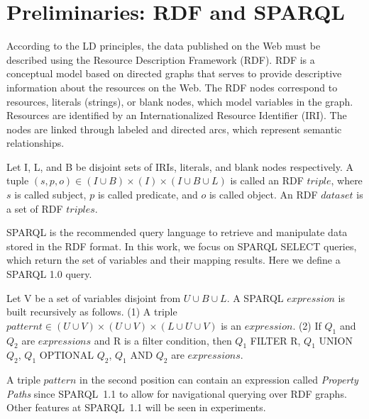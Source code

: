 \documentclass[runningheads]{llncs}
\begin{document}
%
\section{Preliminaries: RDF and SPARQL}
\label{sec:preliminar}

According to the LD principles, the data published on the Web must be described using the Resource Description Framework (RDF). RDF is a conceptual model based on directed graphs that serves to provide descriptive information about the resources on the Web. The RDF nodes correspond to resources, literals (strings), or blank nodes, which model variables in the graph. Resources are identified by an Internationalized Resource Identifier (IRI). The nodes are linked through labeled and directed arcs, which represent semantic relationships.

\begin{definition}
	Let I, L, and B be disjoint sets of IRIs, literals, and blank nodes respectively. A tuple $ (s, p, o) \in (I \cup  B)  \times (I)  \times  (I \cup  B \cup  L)$  is called an RDF $ triple $, where $ s $ is called subject, $ p $ is called predicate, and $ o $ is called object. An RDF $dataset$ is a set of RDF $triples$.
\end{definition}

SPARQL is the recommended query language to retrieve and manipulate data stored in the RDF format. In this work, we focus on SPARQL SELECT queries, which return the set of variables and their mapping results. Here we define a SPARQL 1.0 query. 

\begin{definition}
	Let V be a set of variables disjoint from $U \cup B \cup L$. A SPARQL $expression$ is built recursively as follows. (1) A triple $pattern t \in  (U \cup V ) \times (U \cup V ) \times (L \cup U \cup V )$ is an $expression$. (2) If $Q_1$ and $Q_2$ are $expressions$ and R is a filter condition, then $Q_1$ FILTER R, $Q_1$ UNION $Q_2$, $Q_1$ OPTIONAL $Q_2$, $Q_1$ AND $Q_2$ are $expressions$.
\end{definition}

A triple $ pattern $ in the second position can contain an expression called \textit{Property Paths} since SPARQL~1.1 to allow for navigational querying over RDF graphs. Other features at SPARQL~1.1 will be seen in experiments.
\end{document}
